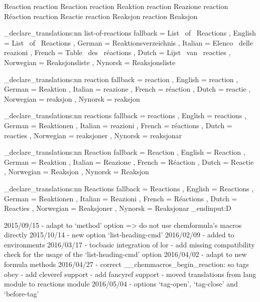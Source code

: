  {Reaction}
   {reaction} {Reaction}
    {reaction} {Reaktion}
   {reaction} {Reazione}
    {reaction} {R\'{e}action}
     {reaction} {Reactie}
 {reaction} {Reaksjon}
   {reaction} {Reaksjon}
\EndChemCompatibility

\chemmacros_declare_translations:nn {list-of-reactions}
  {
    fallback  = List~ of~ Reactions ,
    English   = List~ of~ Reactions ,
    German    = Reaktionsverzeichnis ,
    Italian   = Elenco~ delle~ reazioni ,
    French    = Table~ des~ r\'{e}actions ,
    Dutch     = Lijst~ van~ reacties ,
    Norwegian = Reaksjonsliste ,
    Nynorsk   = Reaksjonsliste
  }

\chemmacros_declare_translations:nn {reaction}
  {
    fallback  = reaction ,
    English   = reaction ,
    German    = Reaktion ,
    Italian   = reazione ,
    French    = r\'{e}action ,
    Dutch     = reactie ,
    Norwegian = reaksjon ,
    Nynorsk   = reaksjon
  }

\chemmacros_declare_translations:nn {reactions}
  {
    fallback  = reactions ,
    English   = reactions ,
    German    = Reaktionen ,
    Italian   = reazioni ,
    French    = r\'{e}actions ,
    Dutch     = reacties ,
    Norwegian = reaksjoner ,
	Nynorsk   = reaksjonar
  }

\chemmacros_declare_translations:nn {Reaction}
  {
    fallback  = Reaction ,
    English   = Reaction ,
    German    = Reaktion ,
    Italian   = Reazione ,
    French    = R\'{e}action ,
    Dutch     = Reactie ,
    Norwegian = Reaksjon ,
    Nynorsk   = Reaksjon
  }

\chemmacros_declare_translations:nn {Reactions}
  {
    fallback = Reactions ,
    English  = Reactions ,
    German   = Reaktionen ,
    Italian  = Reazioni ,
    French   = R\'{e}actions ,
    Dutch    = Reacties ,
    Norwegian = Reaksjoner ,
    Nynorsk   = Reaksjonar
 }
\EndChemCompatibility
\tex_endinput:D

2015/09/15 - adapt to `method' option => do not use chemformula's macros
             directly
2015/10/14 - new option `list-heading-cmd'
2016/02/09 - added \ignorespacesafterend to environments
2016/03/17 - tocbasic integration of lor
           - add missing compatibility check for the usage of the
             `list-heading-cmd' option
2016/04/02 - adapt to new formula methods
2016/04/27 - correct \__chemmacros_begin_reaction: so tags obey \thereaction
           - add cleveref support
           - add fancyref support
           - moved translations from lang module to reactions module
2016/05/04 - options `tag-open', `tag-close' and `before-tag'
